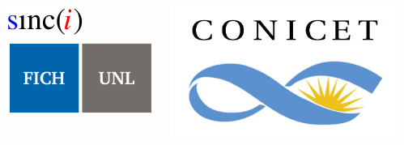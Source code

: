 {\begin{center}
\vspace{2mm}
	\begin{columns}
	\begin{column}{30mm}
	\vspace{-3mm}
	\begin{center}
		\includegraphics[scale = 0.75]{logos/logo_sinc.pdf}\\
		\includegraphics[scale = 0.15]{logos/fichunl_vect.pdf}
	\end{center}
	\end{column}	
	\hspace*{-20mm}
	\begin{column}{30mm}
	\begin{center}
		\includegraphics[scale=0.15]{logos/logo_conicet.pdf}
	\end{center}
	\end{column}
	\hspace*{-20mm}
	\begin{column}{30mm}
	\vspace{-1mm}

\end{column}
\end{columns}
\end{center}}

